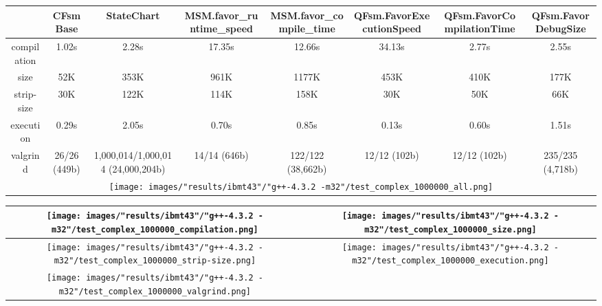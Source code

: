 \begin{landscape}
\begin{table}
\caption{"ibmt43" [df6407d], g++-4.3.2 -m32/test complex 1000000}
\centering
\begin{longtable}{| c | c |c |c |c |c |c |c |}
\hline
& CFsmBase& StateChart& MSM.favor\_runtime\_speed& MSM.favor\_compile\_time& QFsm.FavorExecutionSpeed& QFsm.FavorCompilationTime& QFsm.FavorDebugSize\\
\hline
compilation & 1.02s & 2.28s & 17.35s & 12.66s & 34.13s & 2.77s & 2.55s\\
\hline
size & 52K & 353K & 961K & 1177K & 453K & 410K & 177K\\
\hline
strip-size & 30K & 122K & 114K & 158K & 30K & 50K & 66K\\
\hline
execution & 0.29s & 2.05s & 0.70s & 0.85s & 0.13s & 0.60s & 1.51s\\
\hline
valgrind & 26/26 (449b) & 1,000,014/1,000,014 (24,000,204b) & 14/14 (646b) & 122/122 (38,662b) & 12/12 (102b) & 12/12 (102b) & 235/235 (4,718b)\\
\hline
\multicolumn{8}{|c|}{\texttt{[image: images/"results/ibmt43"/"g++-4.3.2 -m32"/test\_complex\_1000000\_all.png]}}\\
\hline
\end{longtable}
\end{table}
\end{landscape}
\newpage
\begin{table}
\centering
\begin{longtable}{| c | c |}
\hline
\texttt{[image: images/"results/ibmt43"/"g++-4.3.2 -m32"/test\_complex\_1000000\_compilation.png]}& \texttt{[image: images/"results/ibmt43"/"g++-4.3.2 -m32"/test\_complex\_1000000\_size.png]}\\
\hline
\texttt{[image: images/"results/ibmt43"/"g++-4.3.2 -m32"/test\_complex\_1000000\_strip-size.png]}& \texttt{[image: images/"results/ibmt43"/"g++-4.3.2 -m32"/test\_complex\_1000000\_execution.png]}\\
\hline
\texttt{[image: images/"results/ibmt43"/"g++-4.3.2 -m32"/test\_complex\_1000000\_valgrind.png]}& \\ \hline
\end{longtable}
\end{table}
